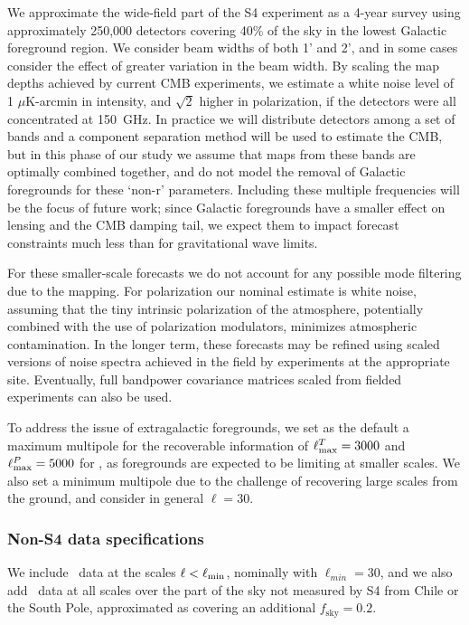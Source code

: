 We approximate the wide-field part of the S4 experiment as a 4-year survey using approximately 250,000 detectors covering 40\% of the sky in the lowest Galactic foreground region. We consider beam widths of both 1' and 2', and in some cases consider the effect of greater variation in the beam width. By scaling the map depths achieved by current CMB experiments, we estimate a white noise level of 1 $\mu$K-arcmin in intensity, and $\sqrt{2}$ higher in polarization, if the detectors were all concentrated at 150~GHz. In practice we will distribute detectors among a set of bands and a component separation method will be used to estimate the CMB, but in this phase of our study we assume that maps from these bands are optimally combined together, and do not model the removal of Galactic foregrounds for these `non-r' parameters. Including these multiple frequencies will be the focus of future work; since Galactic foregrounds have a smaller effect on lensing and the CMB damping tail, we expect them to impact forecast constraints much less than for gravitational wave limits.


For these smaller-scale forecasts we do not account for any possible mode filtering due to the mapping. For polarization our nominal estimate is white noise, assuming that the tiny intrinsic polarization of the atmosphere, potentially combined with the use of polarization modulators, minimizes atmospheric contamination. In the longer term, these forecasts may be refined using scaled versions of noise spectra achieved in the field by experiments at the appropriate site. Eventually, full bandpower covariance matrices scaled from fielded experiments can also be used.


To address the issue of extragalactic foregrounds, we set as the default a maximum multipole for the recoverable information of $\ell^T_{\rm max} = 3000$ and $\ell^P_{\rm max} = 5000$ for \cmbexp, as foregrounds are expected to be limiting at smaller scales. We also set a minimum multipole due to the challenge of recovering large scales from the ground, and consider in general $\ell=30$. 

\subsubsection{Non-S4 data specifications}

We include \planck\ data at the scales $\ell<\ell_{\rm min}$, nominally with $\ell_{min}=30$, and we also add \planck\ data at all scales over the part of the sky not measured by S4 from Chile or the South Pole, approximated as covering an additional $f_\mathrm{sky}=0.2$.


